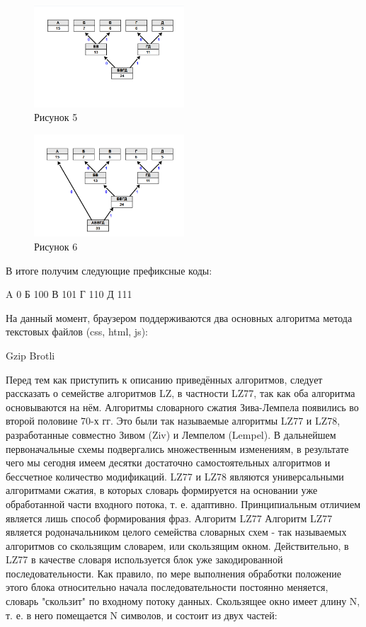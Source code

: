 \documentclass[12pt]{article}
\begin{document}
\begin{figure}[h!]
\centering
\includegraphics[width=0.5\textwidth]{../images/haffman/phase3.png}
\caption{Рисунок 5}
\end{figure}

\begin{figure}[h!]
\centering
\includegraphics[width=0.5\textwidth]{../images/haffman/phase4.png}
\caption{Рисунок 6}
\end{figure}

В итоге получим следующие префиксные коды:

A 0
Б 100
В 101
Г 110
Д 111

На данный момент, браузером поддерживаются два основных алгоритма метода текстовых файлов (css, html, js):

Gzip
Brotli

Перед тем как приступить к описанию приведённых алгоритмов, следует рассказать о семействе алгоритмов LZ, в частности LZ77, так как оба алгоритма основываются на нём.
Алгоритмы словарного сжатия Зива-Лемпела появились во второй половине 70-х гг. Это были так называемые алгоритмы LZ77 и LZ78, разработанные совместно Зивом (Ziv) и Лемпелом (Lempel). В дальнейшем первоначальные схемы подвергались множественным изменениям, в результате чего мы сегодня имеем десятки достаточно самостоятельных алгоритмов и бессчетное количество модификаций.
LZ77 и LZ78 являются универсальными алгоритмами сжатия, в которых словарь формируется на основании уже обработанной части входного потока, т. е. адаптивно. Принципиальным отличием является лишь способ формирования фраз.
Алгоритм LZ77
Алгоритм LZ77 является родоначальником целого семейства словарных схем - так называемых алгоритмов со скользящим словарем, или скользящим окном. Действительно, в LZ77 в качестве словаря используется блок уже закодированной последовательности. Как правило, по мере выполнения обработки положение этого блока относительно начала последовательности постоянно меняется, словарь "скользит" по входному потоку данных. Скользящее окно имеет длину N, т. е. в него помещается N символов, и состоит из двух частей:
\end{document}

